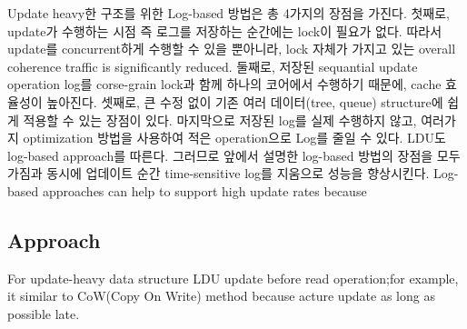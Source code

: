 \fi


%
\ifkor
Update heavy한 구조를 위한 Log-based 방법은 총 4가지의 장점을 가진다. 
첫째로, update가 수행하는 시점 즉 로그를 저장하는 순간에는 lock이 필요가 없다. 
따라서 update를 concurrent하게 수행할 수 있을 뿐아니라, lock 자체가 가지고 있는 overall
coherence traffic is significantly reduced.
둘째로, 저장된 sequantial update operation log를 corse-grain lock과 함께 하나의 코어에서 수행하기
때문에, cache 효율성이 높아진다.
셋째로, 큰 수정 없이 기존 여러 데이터(tree, queue) structure에 쉽게 적용할 수 있는 장점이 있다.
마지막으로 저장된 log를 실제 수행하지 않고, 여러가지 optimization 방법을 사용하여 적은 operation으로 Log를 줄일 수
있다. 
LDU도 log-based approach를 따른다. 그러므로 앞에서 설명한 log-based 방법의 장점을 모두 가짐과 동시에
업데이트 순간 time-sensitive log를 지움으로 성능을 향상시킨다.
\else
Log-based approaches can help to support high update rates because
\fi



\subsection{Approach}


\ifkor
\else
For update-heavy data structure LDU update before read operation;for example, it
similar to CoW(Copy On Write) method because acture update as long as possible
late.
\fi

